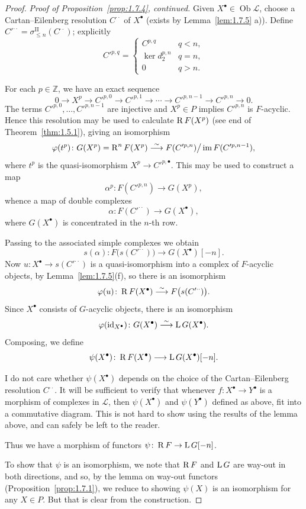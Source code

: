 \begin{proof}
\textit{Proof of Proposition~\ref{prop:1.7.4}, continued.}
Given $X^\bullet\in\operatorname{Ob}\mathcal{L}$, choose a Cartan--Eilenberg resolution $C^{\cdot\cdot}$ of $X^\bullet$ (exists by Lemma~\ref{lem:1.7.5} a)). Define $C'^{\cdot\cdot} = \sigma^{\mathrm{II}}_{\le n}(C^{\cdot\cdot})$; explicitly
\[
C'^{p,q}=
\begin{cases}
C^{p,q} & q<n,\\
\ker d_2^{p,n} & q=n,\\
0 & q>n.
\end{cases}
\]

For each $p\in\mathbb{Z}$, we have an exact sequence
\[
0\to X^p\to C'^{p,0}\to C'^{p,1}\to\cdots\to C'^{p,n-1}\to C'^{p,n}\to 0.
\]
The terms $C'^{p,0},\dots,C'^{p,n-1}$ are injective and $X^p\in P$ implies $C'^{p,n}$ is $F$-acyclic. Hence this resolution may be used to calculate $\operatorname{R} F(X^p)$ (see end of Theorem~\ref{thm:1.5.1}), giving an isomorphism
\[
\varphi(t^p)\colon G(X^p)=\operatorname{R}^nF(X^p) \stackrel{\sim}{\longrightarrow} F(C'^{p,n})\big/\operatorname{im}F(C'^{p,n-1}),
\]
where $t^p$ is the quasi-isomorphism $X^p\to C'^{p,\bullet}$. This may be used to construct a map
\[
\alpha^p\colon F(C'^{p,n})\to G(X^p),
\]
whence a map of double complexes
\[
\alpha\colon F(C'^{\cdot\cdot})\to G(X^\bullet),
\]
where $G(X^\bullet)$ is concentrated in the $n$-th row.

Passing to the associated simple complexes we obtain
\[
s(\alpha)\colon F\big(s(C'^{\cdot\cdot})\big)\to G(X^\bullet)[-n].
\]
Now $u\colon X^\bullet\to s(C'^{\cdot\cdot})$ is a quasi-isomorphism into a complex of $F$-acyclic objects, by Lemma~\ref{lem:1.7.5}(f), so there is an isomorphism
\[
\varphi(u)\colon \operatorname{R} F(X^\bullet) \stackrel{\sim}{\longrightarrow} F\big(s(C'^{\cdot\cdot})\big).
\]
Since $X^\bullet$ consists of $G$-acyclic objects, there is an isomorphism
\[
\varphi(\operatorname{id}_{X^\bullet})\colon G(X^\bullet) \stackrel{\sim}{\longrightarrow} \operatorname{L} G(X^\bullet).
\]
Composing, we define
\[
\psi(X^\bullet)\colon \operatorname{R} F(X^\bullet) \longrightarrow \operatorname{L} G(X^\bullet)[-n].
\]

I do not care whether  $\psi(X^\bullet)$ depends on the choice of the Cartan--Eilenberg resolution $C^{\cdot\cdot}$. It will be sufficient to verify that whenever $f\colon X^\bullet\to Y^\bullet$ is a morphism of complexes in $\mathcal{L}$, then $\psi(X^\bullet)$ and $\psi(Y^\bullet)$ defined as above, fit into a commutative diagram. This is not hard to show using the results of the lemma above, and can safely be left to the reader.

Thus we have a morphism of functors $\psi\colon \operatorname{R} F \to \operatorname{L} G[-n]$.

To show that $\psi$ is an isomorphism, we note that $\operatorname{R} F$ and $\operatorname{L} G$ are way-out in both directions, and so, by the lemma on way-out functors (Proposition~\ref{prop:1.7.1}), we reduce to showing $\psi(X)$ is an isomorphism for any $X\in P$. But that is clear from the construction.
\end{proof}

